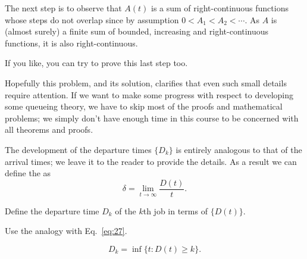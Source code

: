 \begin{exercise}[\faRocket]
\begin{solution}
    The next step is to observe that $A(t)$ is a sum of
    right-continuous functions whose steps do not overlap since by
    assumption $0<A_1 < A_2 < \cdots$. As $A$ is (almost surely)
    a finite sum of bounded, increasing and right-continuous functions,
    it is also right-continuous.

    If you like, you can try to prove this last step too. 

  Hopefully this problem, and its solution, clarifies that even such
  small details require attention. If we want to make some progress
  with respect to developing some queueing theory, we have to skip
  most of the proofs and mathematical problems; we simply don't have
  enough time in this course  to be concerned with all theorems
  and proofs.

 \end{solution}
\end{exercise}

The development of the departure times $\{D_k\}$ is entirely analogous
to that of the arrival times; we leave it to the reader to provide the
details. As a result we can define the  as
\begin{equation}\label{eq:28}
  \delta = \lim_{t\to\infty} \frac{D(t)}t.
\end{equation}


\begin{exercise}[\faFlask]
  Define the departure time $D_{k}$ of the $k$th job in terms of
  $\{D(t)\}$. 
  \begin{hint}
Use the analogy with Eq.~\eqref{eq:27}.
  \end{hint}
\begin{solution}
  \begin{equation*}
 D_{k} = \inf\{t: D(t) \geq k\}.
  \end{equation*}
\end{solution}
\end{exercise}

